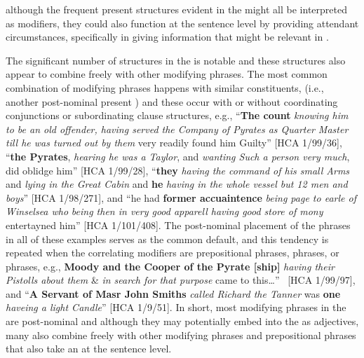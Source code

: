 although the frequent present  structures evident in the  might all be interpreted as  modifiers, they could also function at the sentence level by providing attendant circumstances, specifically in giving information that might be relevant in . 

The significant number of  structures in the  is notable and these structures also appear to combine freely with other modifying phrases. The most common combination of modifying phrases happens with similar constituents, (i.e., another post-nominal present ) and these occur with or without coordinating conjunctions or subordinating clause structures, e.g.,  “\textbf{The count} \textit{knowing him to be an old offender, having served the Company of Pyrates as Quarter Master till he was turned out by them} very readily found him Guilty” [HCA 1/99/36], “\textbf{the Pyrates}, \textit{hearing he was a Taylor}, and \textit{wanting Such a person very much}, did oblidge him” [HCA 1/99/28], “\textbf{they} \textit{having the command of his small Arms} and \textit{lying in the Great Cabin} and \textbf{he} \textit{having in the whole vessel but 12 men and boys}” [HCA 1/98/271], and “he had \textbf{former accuaintence} \textit{being page to earle of Winselsea who} \textit{being then in very good apparell having good store of mony} entertayned him” [HCA 1/101/408]. The post-nominal placement of the  phrases in all of these examples serves as the common default, and this tendency is repeated when the correlating modifiers are prepositional phrases,  phrases, or  phrases, e.g., \textbf{Moody and the Cooper of the Pyrate [ship]} \textit{having their Pistolls about them} \& \textit{in search for that purpose} came to this…” ~[HCA 1/99/97], and “\textbf{A Servant of Masr John Smiths} \textit{called Richard the Tanner} was \textbf{one} \textit{haveing a light Candle}” [HCA 1/9/51]. In short, most modifying  phrases in the  are post-nominal and although they may potentially embed into the  as adjectives, many also combine freely with other modifying  phrases and prepositional phrases that also take an  at the sentence level. 

